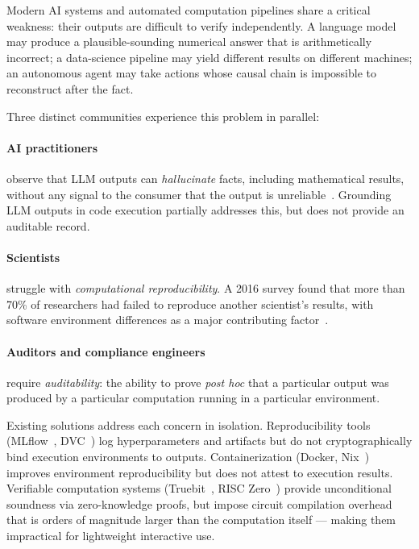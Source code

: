 \documentclass[11pt]{article}
\begin{document}
Modern AI systems and automated computation pipelines share a critical
weakness: their outputs are difficult to verify independently.  A language
model may produce a plausible-sounding numerical answer that is
arithmetically incorrect; a data-science pipeline may yield different
results on different machines; an autonomous agent may take actions whose
causal chain is impossible to reconstruct after the fact.

Three distinct communities experience this problem in parallel:

\paragraph{AI practitioners} observe that LLM outputs can \emph{hallucinate}
facts, including mathematical results, without any signal to the consumer
that the output is unreliable~\citep{ji2023survey}.  Grounding LLM outputs
in code execution partially addresses this, but does not provide an
auditable record.

\paragraph{Scientists} struggle with \emph{computational reproducibility}.
A 2016 survey found that more than 70\% of researchers had failed to
reproduce another scientist's results, with software environment differences
as a major contributing factor~\citep{baker2016reproducibility}.

\paragraph{Auditors and compliance engineers} require \emph{auditability}:
the ability to prove \emph{post hoc} that a particular output was produced
by a particular computation running in a particular environment.

Existing solutions address each concern in isolation.  Reproducibility
tools (MLflow~\citep{mlflow}, DVC~\citep{dvc}) log hyperparameters and
artifacts but do not cryptographically bind execution environments to
outputs.  Containerization (Docker, Nix~\citep{nix}) improves environment
reproducibility but does not attest to execution results.  Verifiable
computation systems (Truebit~\citep{truebit}, RISC Zero~\citep{risczero})
provide unconditional soundness via zero-knowledge proofs, but impose
circuit compilation overhead that is orders of magnitude larger than the
computation itself — making them impractical for lightweight interactive
use.
\end{document}
